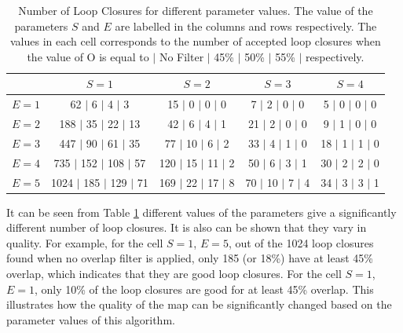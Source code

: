 \documentclass[11pt]{article}
\begin{document}
\begin{table}[h!]
	\vspace*{1cm}
	\centering
	\begin{tabular}{||c || c | c | c | c  ||} 
		\hline
		\textbf{} & \textbf{$S=1$} & \textbf{$S=2$} & \textbf{$S=3$} & \textbf{$S=4$}\\ [0.5ex] 
		\hline\hline
		\textbf{$E=1$} & \hphantom{00}62 $\vert$ \hphantom{00}6 $\vert$ \hphantom{00}4 $\vert$ \hphantom{0}3 & \hphantom{0}15 $\vert$ \hphantom{0}0 $\vert$ \hphantom{0}0 $\vert$ 0  & \hphantom{0}7 $\vert$ \hphantom{0}2 $\vert$ 0 $\vert$ 0 & \hphantom{0}5 $\vert$ 0 $\vert$ 0 $\vert$ 0 \\ 
		\textbf{$E=2$} & \hphantom{0}188 $\vert$ \hphantom{0}35 $\vert$ \hphantom{0}22 $\vert$ 13 & \hphantom{0}42 $\vert$ \hphantom{0}6 $\vert$ \hphantom{0}4 $\vert$ 1 & 21 $\vert$ \hphantom{0}2 $\vert$ 0 $\vert$ 0 & \hphantom{0}9 $\vert$ 1 $\vert$ 0 $\vert$ 0 \\
		\textbf{$E=3$} & \hphantom{0}447 $\vert$ \hphantom{0}90 $\vert$ \hphantom{0}61 $\vert$ 35 & \hphantom{0}77 $\vert$ 10 $\vert$ \hphantom{0}6 $\vert$ 2 & 33 $\vert$ \hphantom{0}4 $\vert$ 1 $\vert$ 0 & 18 $\vert$ 1 $\vert$ 1 $\vert$ 0 \\
		\textbf{$E=4$} & \hphantom{0}735 $\vert$ 152 $\vert$ 108 $\vert$ 57 & 120 $\vert$ 15 $\vert$ 11 $\vert$ 2 & 50 $\vert$ \hphantom{0}6 $\vert$ 3 $\vert$ 1 & 30 $\vert$ 2 $\vert$ 2 $\vert$ 0 \\
		\textbf{$E=5$} & 1024 $\vert$ 185 $\vert$ 129 $\vert$ 71 &  169 $\vert$ 22 $\vert$ 17 $\vert$ 8 & 70 $\vert$ 10 $\vert$ 7 $\vert$ 4 & 34 $\vert$ 3 $\vert$ 3 $\vert$ 1 \\ [1ex] 
		\hline
	\end{tabular}
	\caption{Number of Loop Closures for different parameter values. The value of the parameters $S$ and $E$ are labelled in the columns and rows respectively. The values in each cell corresponds to the number of accepted loop closures when the value of O is equal to $\vert$ No Filter $\vert$ 45\% $\vert$ 50\% $\vert$ 55\% $\vert$ respectively. }
	\label{table:LoopClosure}
\end{table}
	
It can be seen from Table \ref{table:LoopClosure} different values of the parameters give a significantly different number of loop closures. It is also can be shown that they vary in quality. For example, for the cell $S=1$, $E=5$, out of the 1024 loop closures found when no overlap filter is applied, only 185 (or 18\%) have at least 45\% overlap, which indicates that they are good loop closures. For the cell $S=1$, $E=1$, only 10\% of the loop closures are good for at least 45\% overlap. This illustrates how the quality of the map can be significantly changed based on the parameter values of this algorithm.
\end{document}
